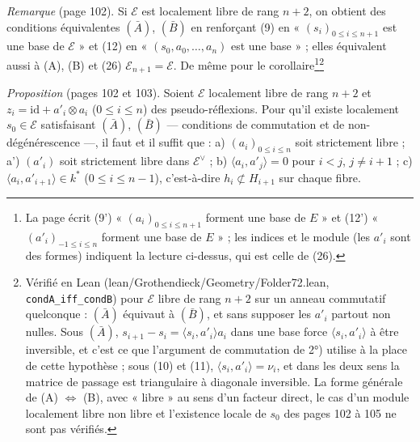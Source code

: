 \documentclass[11pt,a4paper]{article}
\begin{document}
\emph{Remarque} (page 102). Si $\mathcal{E}$ est localement libre de rang $n+2$,
on obtient des conditions équivalentes $(\bar A)$, $(\bar B)$ en renforçant (9) en
« $(s_i)_{0 \leqslant i \leqslant n+1}$ est une base de $\mathcal{E}$ » et (12) en
« $(s_0, a_0, \ldots, a_n)$ est une base » ; elles équivalent aussi à (A), (B) et
(26) $\mathcal{E}_{n+1} = \mathcal{E}$. De même pour le corollaire\footnote{La
page écrit (9') « $(a_i)_{0 \leqslant i \leqslant n+1}$ forment une base de $E$ »
et (12') « $(a'_i)_{-1 \leqslant i \leqslant n}$ forment une base de $E$ » ; les
indices et le module (les $a'_i$ sont des formes) indiquent la lecture
ci-dessus, qui est celle de (26).}\footnote{Vérifié en Lean
(lean/Grothendieck/Geometry/Folder72.lean, \texttt{condA\_iff\_condB}) pour
$\mathcal{E}$ libre de rang $n+2$ sur un anneau commutatif quelconque :
$(\bar A)$ équivaut à $(\bar B)$, et sans supposer les $a'_i$ partout non
nulles. Sous $(\bar A)$, $s_{i+1} - s_i = \langle s_i, a'_i \rangle a_i$ dans
une base force $\langle s_i, a'_i \rangle$ à être inversible, et c'est ce que
l'argument de commutation de 2°) utilise à la place de cette hypothèse ; sous
(10) et (11), $\langle s_i, a'_i \rangle = \nu_i$, et dans les deux sens la
matrice de passage est triangulaire à diagonale inversible. La forme générale de
(A) $\Leftrightarrow$ (B), avec « libre » au sens d'un facteur direct, le cas
d'un module localement libre non libre et l'existence locale de $s_0$ des
pages 102 à 105 ne sont pas vérifiés.}

\emph{Proposition} (pages 102 et 103). Soient $\mathcal{E}$ localement libre de rang
$n+2$ et $z_i = \mathrm{id} + a'_i \otimes a_i$ ($0 \leqslant i \leqslant n$) des
pseudo-réflexions. Pour qu'il existe localement $s_0 \in \mathcal{E}$
satisfaisant $(\bar A)$, $(\bar B)$ --- conditions de commutation et de
non-dégénérescence ---, il faut et il suffit que : a) $(a_i)_{0 \leqslant i
\leqslant n}$ soit strictement libre ; a') $(a'_i)$ soit strictement libre dans
$\mathcal{E}^\vee$ ; b) $\langle a_i, a'_j \rangle = 0$ pour $i < j$, $j \neq
i+1$ ; c) $\langle a_i, a'_{i+1} \rangle \in k^*$ ($0 \leqslant i \leqslant
n-1$), c'est-à-dire $h_i \not\subset H_{i+1}$ sur chaque fibre.
\end{document}
